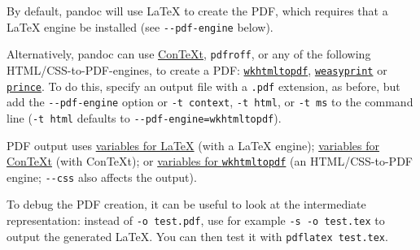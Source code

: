By default, pandoc will use LaTeX to create the PDF, which requires that
a LaTeX engine be installed (see \texttt{-\/-pdf-engine} below).

Alternatively, pandoc can use
\href{http://www.contextgarden.net/}{ConTeXt}, \texttt{pdfroff}, or any
of the following HTML/CSS-to-PDF-engines, to create a PDF:
\href{https://wkhtmltopdf.org}{\texttt{wkhtmltopdf}},
\href{http://weasyprint.org}{\texttt{weasyprint}} or
\href{https://www.princexml.com/}{\texttt{prince}}. To do this, specify
an output file with a \texttt{.pdf} extension, as before, but add the
\texttt{-\/-pdf-engine} option or \texttt{-t\ context},
\texttt{-t\ html}, or \texttt{-t\ ms} to the command line
(\texttt{-t\ html} defaults to \texttt{-\/-pdf-engine=wkhtmltopdf}).

PDF output uses \protect\hyperlink{variables-for-latex}{variables for
LaTeX} (with a LaTeX engine);
\protect\hyperlink{variables-for-context}{variables for ConTeXt} (with
ConTeXt); or \protect\hyperlink{variables-for-wkhtmltopdf}{variables for
\texttt{wkhtmltopdf}} (an HTML/CSS-to-PDF engine; \texttt{-\/-css} also
affects the output).

To debug the PDF creation, it can be useful to look at the intermediate
representation: instead of \texttt{-o\ test.pdf}, use for example
\texttt{-s\ -o\ test.tex} to output the generated LaTeX. You can then
test it with \texttt{pdflatex\ test.tex}.

